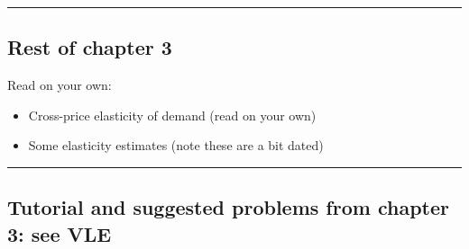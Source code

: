 \documentclass[]{article}
\begin{document}
\begin{center}\rule{0.5\linewidth}{\linethickness}\end{center}

\hypertarget{rest-of-chapter-3}{%
\subsection{Rest of chapter 3}\label{rest-of-chapter-3}}

Read on your own:

\begin{itemize}
\item
  Cross-price elasticity of demand (read on your own)
\item
  Some elasticity estimates (note these are a bit dated)
\end{itemize}

\begin{center}\rule{0.5\linewidth}{\linethickness}\end{center}

\hypertarget{tutorial-and-suggested-problems-from-chapter-3-see-vle}{%
\subsection{Tutorial and suggested problems from chapter 3: see
VLE}\label{tutorial-and-suggested-problems-from-chapter-3-see-vle}}
\end{document}
